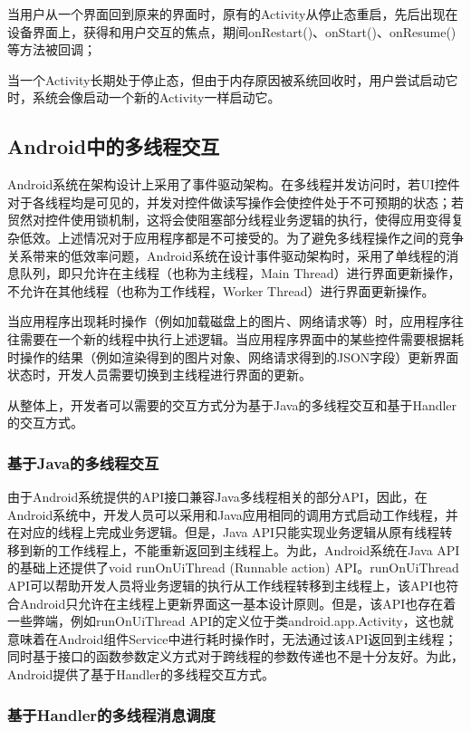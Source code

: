 当用户从一个界面回到原来的界面时，原有的Activity从停止态重启，先后出现在设备界面上，获得和用户交互的焦点，期间onRestart()、onStart()、onResume()等方法被回调；

当一个Activity长期处于停止态，但由于内存原因被系统回收时，用户尝试启动它时，系统会像启动一个新的Activity一样启动它。

\subsection{	Android中的多线程交互}
 Android系统在架构设计上采用了事件驱动架构。在多线程并发访问时，若UI控件对于各线程均是可见的，并发对控件做读写操作会使控件处于不可预期的状态；若贸然对控件使用锁机制，这将会使阻塞部分线程业务逻辑的执行，使得应用变得复杂低效。上述情况对于应用程序都是不可接受的。为了避免多线程操作之间的竞争关系带来的低效率问题，Android系统在设计事件驱动架构时，采用了单线程的消息队列，即只允许在主线程（也称为主线程，Main Thread）进行界面更新操作，不允许在其他线程（也称为工作线程，Worker Thread）进行界面更新操作。

当应用程序出现耗时操作（例如加载磁盘上的图片、网络请求等）时，应用程序往往需要在一个新的线程中执行上述逻辑。当应用程序界面中的某些控件需要根据耗时操作的结果（例如渲染得到的图片对象、网络请求得到的JSON字段）更新界面状态时，开发人员需要切换到主线程进行界面的更新。

从整体上，开发者可以需要的交互方式分为基于Java的多线程交互和基于Handler的交互方式。

\subsubsection{基于Java的多线程交互}

由于Android系统提供的API接口兼容Java多线程相关的部分API，因此，在Android系统中，开发人员可以采用和Java应用相同的调用方式启动工作线程，并在对应的线程上完成业务逻辑。但是，Java API只能实现业务逻辑从原有线程转移到新的工作线程上，不能重新返回到主线程上。为此，Android系统在Java API的基础上还提供了void runOnUiThread (Runnable action) API。runOnUiThread API可以帮助开发人员将业务逻辑的执行从工作线程转移到主线程上，该API也符合Android只允许在主线程上更新界面这一基本设计原则。但是，该API也存在着一些弊端，例如runOnUiThread API的定义位于类android.app.Activity，这也就意味着在Android组件Service中进行耗时操作时，无法通过该API返回到主线程；同时基于接口的函数参数定义方式对于跨线程的参数传递也不是十分友好。为此，Android提供了基于Handler的多线程交互方式。

\subsubsection{基于Handler的多线程消息调度}

